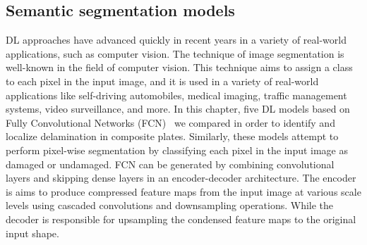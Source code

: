\subsection{Semantic segmentation models}
\label{section:semantic_segmentation}
DL approaches have advanced quickly in recent years in a variety of real-world applications, such as computer vision.
The technique of image segmentation is well-known in the field of computer vision.
This technique aims to assign a class to each pixel in the input image, and it is used in a variety of real-world applications like self-driving automobiles, medical imaging, traffic management systems, video surveillance, and more.
In this chapter, five DL models based on Fully Convolutional Networks (FCN)~\cite{Shelhamer2017a} we compared in order to identify and localize delamination in composite plates.
Similarly, these models attempt to perform pixel-wise segmentation by classifying each pixel in the input image as damaged or undamaged.
FCN can be generated by combining convolutional layers and skipping dense layers in an encoder-decoder architecture.
The encoder is aims to produce compressed feature maps from the input image at various scale levels using cascaded convolutions and downsampling operations.
While the decoder is responsible for upsampling the condensed feature maps to the original input shape.

